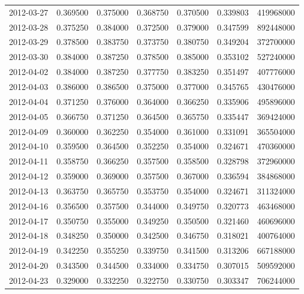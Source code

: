 \begin{tabular}{lrrrrrr}
2012-03-27 &    0.369500 &    0.375000 &    0.368750 &    0.370500 &    0.339803 &   419968000 \\
2012-03-28 &    0.375250 &    0.384000 &    0.372500 &    0.379000 &    0.347599 &   892448000 \\
2012-03-29 &    0.378500 &    0.383750 &    0.373750 &    0.380750 &    0.349204 &   372700000 \\
2012-03-30 &    0.384000 &    0.387250 &    0.378500 &    0.385000 &    0.353102 &   527240000 \\
2012-04-02 &    0.384000 &    0.387250 &    0.377750 &    0.383250 &    0.351497 &   407776000 \\
2012-04-03 &    0.386000 &    0.386500 &    0.375000 &    0.377000 &    0.345765 &   430476000 \\
2012-04-04 &    0.371250 &    0.376000 &    0.364000 &    0.366250 &    0.335906 &   495896000 \\
2012-04-05 &    0.366750 &    0.371250 &    0.364500 &    0.365750 &    0.335447 &   369424000 \\
2012-04-09 &    0.360000 &    0.362250 &    0.354000 &    0.361000 &    0.331091 &   365504000 \\
2012-04-10 &    0.359500 &    0.364500 &    0.352250 &    0.354000 &    0.324671 &   470360000 \\
2012-04-11 &    0.358750 &    0.366250 &    0.357500 &    0.358500 &    0.328798 &   372960000 \\
2012-04-12 &    0.359000 &    0.369000 &    0.357500 &    0.367000 &    0.336594 &   384868000 \\
2012-04-13 &    0.363750 &    0.365750 &    0.353750 &    0.354000 &    0.324671 &   311324000 \\
2012-04-16 &    0.356500 &    0.357500 &    0.344000 &    0.349750 &    0.320773 &   463468000 \\
2012-04-17 &    0.350750 &    0.355000 &    0.349250 &    0.350500 &    0.321460 &   460696000 \\
2012-04-18 &    0.348250 &    0.350000 &    0.342500 &    0.346750 &    0.318021 &   400764000 \\
2012-04-19 &    0.342250 &    0.355250 &    0.339750 &    0.341500 &    0.313206 &   667188000 \\
2012-04-20 &    0.343500 &    0.344500 &    0.334000 &    0.334750 &    0.307015 &   509592000 \\
2012-04-23 &    0.329000 &    0.332250 &    0.322750 &    0.330750 &    0.303347 &   706244000 \\

\end{tabular}
